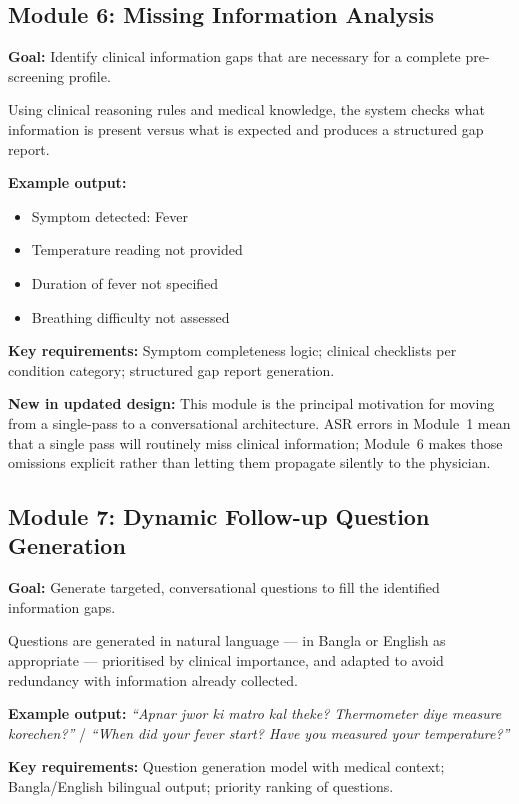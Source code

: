 \documentclass[12pt,a4paper]{article}
\begin{document}
\subsection{Module 6: Missing Information Analysis}
\label{sec:m6}

\textbf{Goal:} Identify clinical information gaps that are necessary for
a complete pre-screening profile.

Using clinical reasoning rules and medical knowledge, the system checks
what information is present versus what is expected and produces a
structured gap report.

\textbf{Example output:}
\begin{itemize}[leftmargin=*, noitemsep]
  \item[\checkmark] Symptom detected: Fever
  \item[$\times$] Temperature reading not provided
  \item[$\times$] Duration of fever not specified
  \item[$\times$] Breathing difficulty not assessed
\end{itemize}

\textbf{Key requirements:} Symptom completeness logic; clinical
checklists per condition category; structured gap report generation.

\textbf{New in updated design:} This module is the principal motivation
for moving from a single-pass to a conversational architecture. ASR
errors in Module~1 mean that a single pass will routinely miss clinical
information; Module~6 makes those omissions explicit rather than letting
them propagate silently to the physician.

\subsection{Module 7: Dynamic Follow-up Question Generation}
\label{sec:m7}

\textbf{Goal:} Generate targeted, conversational questions to fill the
identified information gaps.

Questions are generated in natural language --- in Bangla or English as
appropriate --- prioritised by clinical importance, and adapted to avoid
redundancy with information already collected.

\textbf{Example output:} \textit{``Apnar jwor ki matro kal theke?
Thermometer diye measure korechen?''} / \textit{``When did your fever
start? Have you measured your temperature?''}

\textbf{Key requirements:} Question generation model with medical
context; Bangla/English bilingual output; priority ranking of questions.
\end{document}
